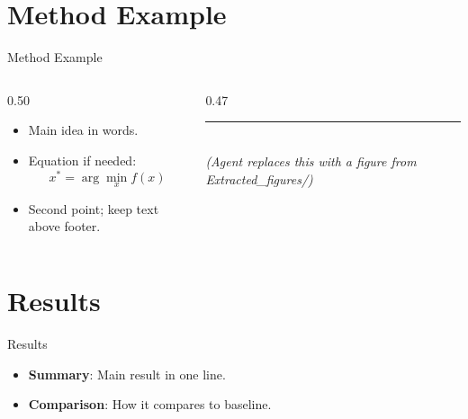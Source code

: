 \documentclass[aspectratio=169,11pt]{beamer}
\begin{document}
\section{Method Example}
\begin{frame}{Method Example}
  \vspace{-0.4em}
  \begin{columns}[T]
    \begin{column}{0.50\textwidth}
      \begin{itemize}
        \item Main idea in words.
        \item Equation if needed:
        \[
          x^* = \arg\min_x f(x)
        \]
        \item Second point; keep text above footer.
      \end{itemize}
    \end{column}
    \begin{column}{0.47\textwidth}
      \centering
      \rule{0.8\linewidth}{0.58\textheight}\\[0.5em]
      \small\textit{(Agent replaces this with a figure from Extracted\_figures/)}
    \end{column}
  \end{columns}
\end{frame}

\section{Results}
\begin{frame}{Results}
  \begin{itemize}
    \item \textbf{Summary}: Main result in one line.
    \item \textbf{Comparison}: How it compares to baseline.
  \end{itemize}
\end{frame}
\end{document}
